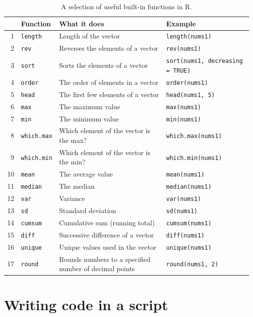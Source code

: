 \documentclass[]{book}
\begin{document}
\begin{table}[ht]
\centering
\begin{tabular}{rlll}
  \hline
 & Function & What it does & Example \\ 
  \hline
1 & \texttt{length} & Length of the vector & \texttt{length(nums1)} \\ 
  2 & \texttt{rev} & Reverses the elements of a vector & \texttt{rev(nums1)} \\ 
  3 & \texttt{sort} & Sorts the elements of a vector & \texttt{sort(nums1, decreasing = TRUE)} \\ 
  4 & \texttt{order} & The order of elements in a vector & \texttt{order(nums1)} \\ 
  5 & \texttt{head} & The first few elements of a vector & \texttt{head(nums1, 5)} \\ 
  6 & \texttt{max} & The maximum value & \texttt{max(nums1)} \\ 
  7 & \texttt{min} & The minimum value & \texttt{min(nums1)} \\ 
  8 & \texttt{which.max} & Which element of the vector is the max? & \texttt{which.max(nums1)} \\ 
  9 & \texttt{which.min} & Which element of the vector is the min? & \texttt{which.min(nums1)} \\ 
  10 & \texttt{mean} & The average value & \texttt{mean(nums1)} \\ 
  11 & \texttt{median} & The median & \texttt{median(nums1)} \\ 
  12 & \texttt{var} & Variance & \texttt{var(nums1)} \\ 
  13 & \texttt{sd} & Standard deviation & \texttt{sd(nums1)} \\ 
  14 & \texttt{cumsum} & Cumulative sum (running total) & \texttt{cumsum(nums1)} \\ 
  15 & \texttt{diff} & Successive difference of a vector & \texttt{diff(nums1)} \\ 
  16 & \texttt{unique} & Unique values used in the vector & \texttt{unique(nums1)} \\ 
  17 & \texttt{round} & Rounds numbers to a specified number of decimal points & \texttt{round(nums1, 2)} \\ 
   \hline
\end{tabular}
\caption{A selection of useful built-in functions in R.} 
\end{table}

\hypertarget{writing-code-in-a-script}{%
\section{Writing code in a script}\label{writing-code-in-a-script}}
\end{document}
